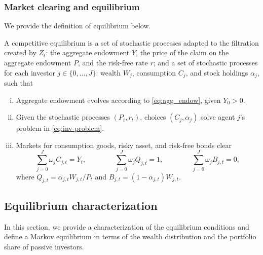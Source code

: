 \subsubsection{Market clearing and equilibrium}
We provide the definition of equilibrium below.
\begin{defn}
A competitive equilibrium is a set of stochastic processes adapted to the filtration created by $Z_t$: the aggregate endowment $Y$, the price of the claim on the aggregate endowment $P$, and the risk-free rate $r$; and a set of stochastic processes for each investor $j\in\{0,\ldots,J\}$: wealth $W_j$, consumption $C_j$, and stock holdings $\alpha_j$, such that
\begin{enumerate}[(i)]
    \item Aggregate endowment evolves according to \eqref{eq:agg_endow}, given $Y_0>0$.
    \item Given the stochastic processes $\left(P_t, r_t\right)$, choices $\left(C_j,\alpha_j\right)$ solve agent $j$'s problem in \eqref{eq:inv-problem}.
    \item Markets for consumption goods, risky asset, and risk-free bonds clear
    \begin{equation}
    \sum_{j=0}^J \omega_j C_{j,t} = Y_t, \qquad \qquad 
    \sum_{j=0}^J \omega_j Q_{j,t}= 1, \qquad \qquad 
\sum_{j=0}^J \omega_j B_{j,t}= 0,
\end{equation}
where $Q_{j,t} = \alpha_{j,t} W_{j,t} / P_t$ and $B_{j,t} = (1-\alpha_{j,t}) W_{j,t}$.
\end{enumerate}
\end{defn}



\subsection{Equilibrium characterization}\label{sec:equilibrium-char}

In this section, we provide a characterization of the equilibrium conditions and define a Markov equilibrium in terms of the wealth distribution and the portfolio share of passive investors. 

